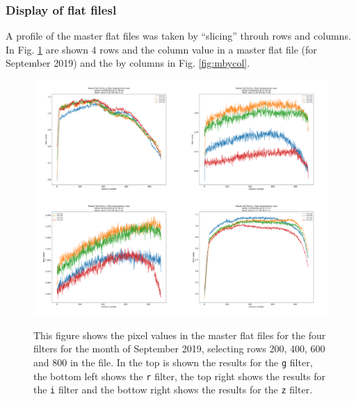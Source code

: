 \subsubsection{Display of flat filesl}

A profile of the master flat files was taken by ``slicing'' throuh rows and
columns. In Fig. \ref{fig:mbyrow} are shown 4 rows and the column value in a master flat file (for September 2019) and the
by columns in Fig. \ref{fig:mbycol}.

\begin{figure}[!htbp]
\begin{center}
\includegraphics[scale=0.25]{images/Cmrowd.png} \\
\end{center}   
\caption{This figure shows the pixel values in the master flat files for the
four filters for the month of September 2019, selecting rows 200, 400, 600 and
800 in the file.
In the top is shown the results for the \texttt{g} filter, the bottom left shows the \texttt{r} filter,
the top right shows the results for the \texttt{i} filter and the bottow right
shows the results for the \texttt{z} filter. }
\protect\label{fig:mbyrow}
\end{figure}

